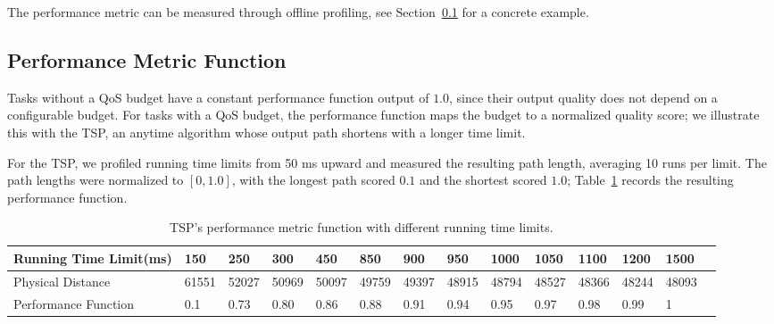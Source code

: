     The performance metric can be measured through offline profiling,
    see Section~\ref{section_generate_tsp_perf} for a concrete example.

	\subsection{Performance Metric Function}
	\label{section_generate_tsp_perf}
	Tasks without a QoS budget have a constant performance function output of $1.0$, since their output quality does not depend on a configurable budget.
	For tasks with a QoS budget, the performance function maps the budget to a normalized quality score; we illustrate this with the TSP, an anytime algorithm whose output path shortens with a longer time limit.

	\begin{Example}
	For the TSP, we profiled running time limits from 50 ms upward and measured the resulting path length, averaging 10 runs per limit. The path lengths were normalized to $[0, 1.0]$, with the longest path scored $0.1$ and the shortest scored $1.0$; Table~\ref{table_tsp_perf} records the resulting performance function.
	\end{Example}

	\begin{table}[htbp]
	\centering
	\caption{TSP's performance metric function with different running time limits.}
	\begin{tabular}{@{}llllllllllllll@{}}
		\toprule
		Running Time Limit(ms)       & 150   & 250   & 300   & 450   & 850   & 900   & 950   & 1000  & 1050  & 1100  & 1200  & 1500   \\ \midrule
		Physical Distance  & 61551 & 52027 & 50969 & 50097 & 49759 & 49397 & 48915 & 48794 & 48527 & 48366 & 48244 & 48093 \\
		Performance Function & 0.1   & 0.73  & 0.80 & 0.86  & 0.88  & 0.91  & 0.94  & 0.95  & 0.97  & 0.98  & 0.99  & 1        \\ \bottomrule
	\end{tabular}
	\label{table_tsp_perf}
	\end{table}

